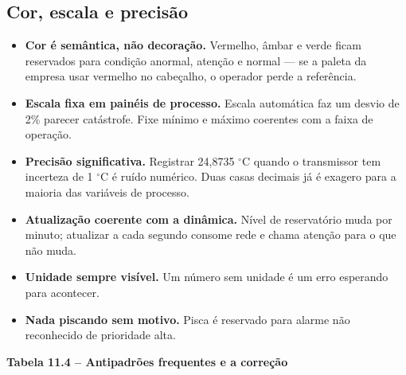 \subsection{Cor, escala e precisão}\label{cor-escala-e-precisuxe3o}

\begin{itemize}
\tightlist
\item
  \textbf{Cor é semântica, não decoração.} Vermelho, âmbar e verde ficam reservados para condição anormal, atenção e normal --- se a paleta da empresa usar vermelho no cabeçalho, o operador perde a referência.
\item
  \textbf{Escala fixa em painéis de processo.} Escala automática faz um desvio de 2\% parecer catástrofe. Fixe mínimo e máximo coerentes com a faixa de operação.
\item
  \textbf{Precisão significativa.} Registrar 24,8735 \ensuremath{^\circ}C quando o transmissor tem incerteza de 1 \ensuremath{^\circ}C é ruído numérico. Duas casas decimais já é exagero para a maioria das variáveis de processo.
\item
  \textbf{Atualização coerente com a dinâmica.} Nível de reservatório muda por minuto; atualizar a cada segundo consome rede e chama atenção para o que não muda.
\item
  \textbf{Unidade sempre visível.} Um número sem unidade é um erro esperando para acontecer.
\item
  \textbf{Nada piscando sem motivo.} Pisca é reservado para alarme não reconhecido de prioridade alta.
\end{itemize}

\textbf{Tabela 11.4 -- Antipadrões frequentes e a correção}

